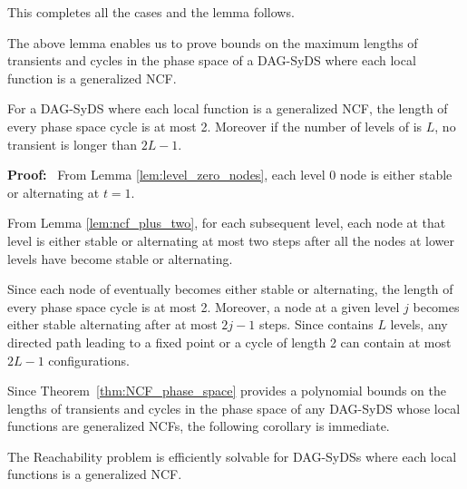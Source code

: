 This completes all the cases and the lemma follows. \QED

\medskip

The above lemma enables us to prove bounds on the maximum
lengths of transients and cycles in the phase space of a DAG-SyDS
where each local function is a generalized NCF.

\medskip

\begin{theorem}\label{thm:NCF_phase_space}
For a DAG-SyDS \cals{} where each local function is a generalized NCF,
the length of every phase space cycle is at most 2.
Moreover if the number of levels of  \cals{} is $L$,
no transient is longer than $2L-1$.
\end{theorem}

\noindent
\textbf{Proof:}~ 
From Lemma \ref{lem:level_zero_nodes},
each level 0 node is either stable or alternating at $t=1$.

\medskip

From Lemma \ref{lem:ncf_plus_two},
for each subsequent level, each node at that level 
is either stable or alternating at most two steps after
all the nodes at lower levels have become stable or alternating.

\medskip

Since each node of  \cals{} eventually becomes either stable or alternating,
 the length of every phase space cycle is at most 2.
Moreover, a node at a given level $j$ becomes either stable alternating
after at most $2j-1$ steps.
Since  \cals{} contains $L$ levels,
any directed path leading to a fixed point or a cycle of length 2
can contain at most $2L-1$ configurations.
\QED

\medskip

Since Theorem~\ref{thm:NCF_phase_space} provides a polynomial bounds
on the lengths of transients and cycles in the phase space of any
DAG-SyDS whose local functions are generalized NCFs,
the following corollary is immediate.

\medskip

\begin{corollary}\label{cor:poly_ncf_dag_syds}
The Reachability problem is efficiently solvable for 
DAG-SyDSs where each local functions is a generalized NCF.
\end{corollary}
